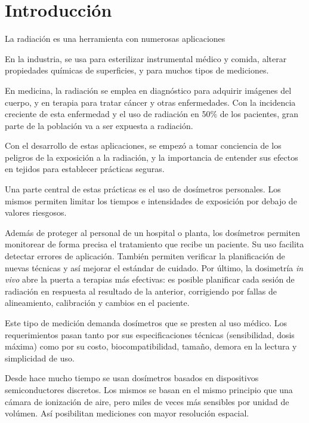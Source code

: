 \section{Introducción}
La radiación es una herramienta con numerosas aplicaciones

En la industria, se usa para esterilizar instrumental médico y comida,
alterar propiedades químicas de superficies\cite{clough_high},
y para muchos tipos de mediciones.

En medicina, la radiación se emplea en diagnóstico para adquirir imágenes del cuerpo,
y en terapia para tratar cáncer y otras enfermedades.
Con la incidencia creciente de esta enfermedad 
y el uso de radiación en 50\% de los
pacientes\cite{symposium_assurance_dosimetry_1994},
gran parte de la población va a ser expuesta a radiación.

Con el desarrollo de estas aplicaciones,
se empezó a tomar conciencia de 
los peligros de la exposición a la radiación,
y la importancia de entender sus efectos en tejidos
para establecer prácticas seguras.

Una parte central de estas prácticas es el uso de dosímetros personales.
Los mismos permiten limitar los tiempos e intensidades de exposición
por debajo de valores riesgosos.

Además de proteger al personal de un hospital o planta,
los dosímetros permiten monitorear de forma precisa 
el tratamiento que recibe un paciente.
Su uso facilita detectar errores de aplicación\cite{noel_detection_1995}.
También permiten verificar la planificación de nuevas
técnicas y así mejorar el estándar de cuidado\cite{essers_vivo_1999}.
Por último, la dosimetría \emph{in vivo} 
abre la puerta a terapias más efectivas:
es posible planificar cada sesión de radiación
en respuesta al resultado de la anterior,
corrigiendo por fallas de alineamiento, calibración 
y cambios en el paciente\cite{wu_application_2006}.

Este tipo de medición demanda dosímetros 
que se presten al uso médico.
Los requerimientos pasan tanto por sus especificaciones técnicas
(sensibilidad, dosis máxima)
como por su costo,
biocompatibilidad, tamaño,
demora en la lectura y simplicidad de uso.

Desde hace mucho tiempo se usan dosímetros basados en 
dispositivos semiconductores discretos.
Los mismos se basan en el mismo principio que una cámara de ionización de aire,
pero miles de veces más sensibles por unidad de volúmen\cite{jones_application_1963}.
Así posibilitan mediciones con mayor resolución espacial.

